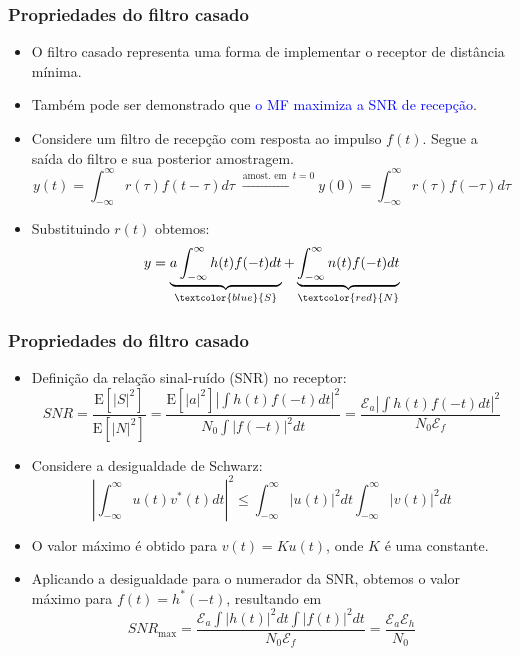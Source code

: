 \begin{frame}
	\frametitle{Propriedades do filtro casado}

	\begin{itemize}
	    \item O filtro casado representa uma forma de implementar o receptor de distância mínima.
	    \item Também pode ser demonstrado que \textcolor{blue}{o MF maximiza a SNR de recepção}.
	    \item Considere um filtro de recepção com resposta ao impulso $f(t)$. Segue a saída do filtro e sua posterior amostragem.
	    \begin{equation*}
		y(t) = \int_{-\infty}^{\infty} r(\tau)f(t-\tau)d\tau \; \xrightarrow{\text{amost. em } \; t=0} y(0) = \int_{-\infty}^{\infty} r(\tau)f(-\tau)d\tau
	    \end{equation*}
	    \item Substituindo $r(t)$ obtemos:
	    \begin{equation*}
		y = \underbrace{a \int_{-\infty}^{\infty} h(t) f(-t) dt}_{\textcolor{blue}{S}} + \underbrace{\int_{-\infty}^{\infty} n(t) f(-t) dt}_{\textcolor{red}{N}}
	    \end{equation*}

	\end{itemize}		
\end{frame}

\begin{frame}
	\frametitle{Propriedades do filtro casado}

	\begin{itemize}
	    \item Definição da relação sinal-ruído (SNR) no receptor:
	    \begin{equation*}
		SNR = \frac{\mathrm{E}[|S|^2]}{\mathrm{E}[|N|^2]} = \frac{\mathrm{E}[|a|^2]\left|\int h(t)f(-t)dt \right|^2}{N_0 \int |f(-t)|^2 dt} = \frac{\mathcal{E}_a \left|\int h(t)f(-t)dt \right|^2}{N_0 \mathcal{E}_f}
	    \end{equation*}
	    \item Considere a desigualdade de Schwarz: 
	    \begin{equation*}
		 \left| \int_{-\infty}^{\infty} u(t) v^*(t) dt \right|^2 \leq \int_{-\infty}^{\infty} |u(t)|^2 dt \int_{-\infty}^{\infty} |v(t)|^2 dt
	    \end{equation*}
	    \item O valor máximo é obtido para $v(t) = K u(t)$, onde $K$ é uma constante.
	    \item Aplicando a desigualdade para o numerador da SNR, obtemos o valor máximo para $f(t) = h^*(-t)$, resultando em
	    \begin{equation*}
		    SNR_{\text{max}} = \frac{\mathcal{E}_a \int |h(t)|^2 dt \int |f(t)|^2dt}{N_0 \mathcal{E}_f} = \frac{\mathcal{E}_a \mathcal{E}_h }{ N_0 }
	    \end{equation*}

	\end{itemize}
\end{frame}


